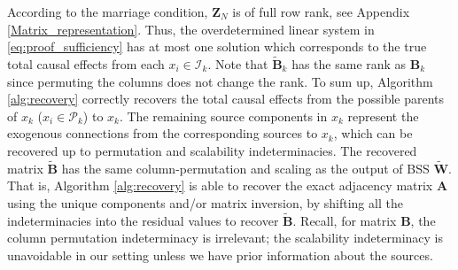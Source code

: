 \documentclass[12pt]{article}
\newcommand{\bA}{\mathbf{A}}
\newcommand{\bB}{\mathbf{B}}
\newcommand{\bW}{\mathbf{W}}
\begin{document}
According to the marriage condition, $\mathbf{Z}_N$ is of full row rank, see Appendix \ref{Matrix_representation}. Thus, the overdetermined linear system in \eqref{eq:proof_sufficiency} has at most one solution which corresponds to the true total causal effects from each $x_i\in\mathcal{I}_k$. Note that $\tilde{\bB}_k$ has the same rank as $\bB_k$ since permuting the columns does not change the rank. %
To sum up, Algorithm \ref{alg:recovery} correctly recovers the total causal effects from the possible parents of $x_k$ ($x_i\in\mathcal{P}_k$) to $x_k$. The remaining source components in $x_k$ represent the exogenous connections from the corresponding sources to $x_k$, which can be recovered up to permutation and scalability indeterminacies. The recovered matrix $\tilde{\bB}$ has the same column-permutation and scaling as the output of BSS $\tilde{\bW}$. That is, Algorithm \ref{alg:recovery} is able to recover the exact adjacency matrix $\bA$ using the unique components and/or matrix inversion, by shifting all the indeterminacies into the residual values to recover $\tilde{\bB}$. Recall, for matrix $\mathbf{B}$, the column permutation indeterminacy is irrelevant; the scalability indeterminacy is unavoidable in our setting unless we have prior information about the sources. 
\end{document}
